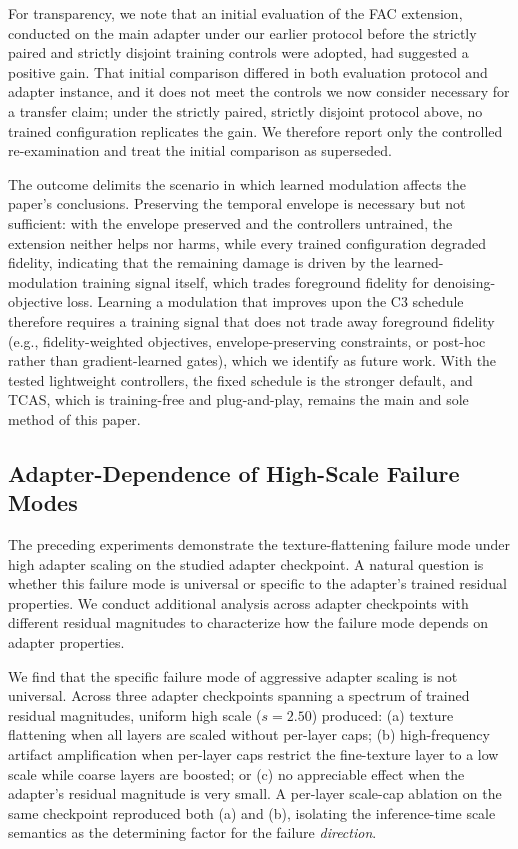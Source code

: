 \documentclass[times,twocolumn,final]{elsarticle}
\begin{document}
For transparency, we note that an initial evaluation of the FAC extension, conducted on the main adapter under our earlier protocol before the strictly paired and strictly disjoint training controls were adopted, had suggested a positive gain. That initial comparison differed in both evaluation protocol and adapter instance, and it does not meet the controls we now consider necessary for a transfer claim; under the strictly paired, strictly disjoint protocol above, no trained configuration replicates the gain. We therefore report only the controlled re-examination and treat the initial comparison as superseded.

The outcome delimits the scenario in which learned modulation affects the paper's conclusions. Preserving the temporal envelope is necessary but not sufficient: with the envelope preserved and the controllers untrained, the extension neither helps nor harms, while every trained configuration degraded fidelity, indicating that the remaining damage is driven by the learned-modulation training signal itself, which trades foreground fidelity for denoising-objective loss. Learning a modulation that improves upon the C3 schedule therefore requires a training signal that does not trade away foreground fidelity (e.g., fidelity-weighted objectives, envelope-preserving constraints, or post-hoc rather than gradient-learned gates), which we identify as future work. With the tested lightweight controllers, the fixed schedule is the stronger default, and TCAS, which is training-free and plug-and-play, remains the main and sole method of this paper.

\FloatBarrier

\subsection{Adapter-Dependence of High-Scale Failure Modes}
\label{subsec:adapterdep}

The preceding experiments demonstrate the texture-flattening failure mode under high adapter scaling on the studied adapter checkpoint. A natural question is whether this failure mode is universal or specific to the adapter's trained residual properties. We conduct additional analysis across adapter checkpoints with different residual magnitudes to characterize how the failure mode depends on adapter properties.

We find that the specific failure mode of aggressive adapter scaling is not universal. Across three adapter checkpoints spanning a spectrum of trained residual magnitudes, uniform high scale ($s = 2.50$) produced: (a) texture flattening when all layers are scaled without per-layer caps; (b) high-frequency artifact amplification when per-layer caps restrict the fine-texture layer to a low scale while coarse layers are boosted; or (c) no appreciable effect when the adapter's residual magnitude is very small. A per-layer scale-cap ablation on the same checkpoint reproduced both (a) and (b), isolating the inference-time scale semantics as the determining factor for the failure \emph{direction}.
\end{document}
